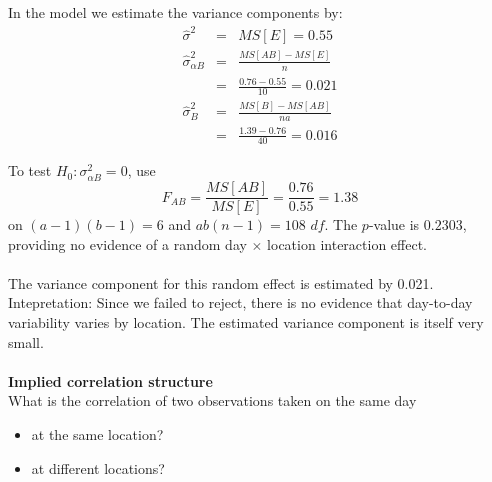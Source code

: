 In the model we estimate the variance components by:
\begin{eqnarray*}
\hat\sigma^2 & = & MS[E]  =  0.55 \\
\hat\sigma_{\alpha B}^2 & = & \frac{MS[AB]-MS[E]}{n} \\
& = & \frac{0.76-0.55}{10}  =  0.021  \\
\hat\sigma_{B}^2 & = & \frac{MS[B]-MS[AB]}{na} \\
& = & \frac{1.39-0.76}{40}  =  0.016
\end{eqnarray*}

To test $H_0: \sigma_{\alpha B}^2=0$, use 
$$F_{AB}=\frac{MS[AB]}{MS[E]}=\frac{0.76}{0.55}=1.38$$
on $(a-1)(b-1)=6$ and $ab(n-1)=108$ $df$.  The $p$-value is $0.2303$, providing no evidence of a random day $\times$ location interaction effect. \\~\\
The variance component for this random effect is estimated by 0.021.  Intepretation: Since we failed to reject, there is no evidence that day-to-day variability varies by location.  The estimated variance component is itself very small.\\~\\

\textbf{Implied correlation structure}\\
What is the correlation of two observations taken on the same day 
\begin{itemize}
\item at the same location? 
\item at different locations? 
\end{itemize}

